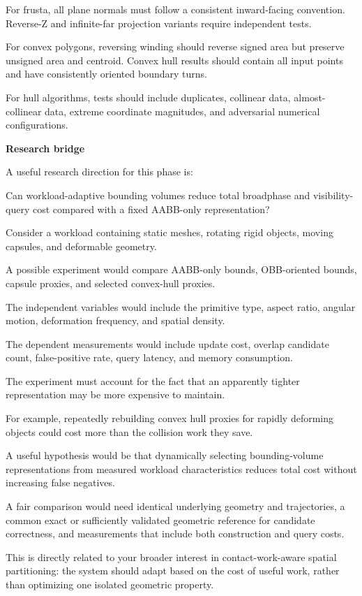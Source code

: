 For frusta, all plane normals must follow a consistent inward-facing convention. Reverse-Z and infinite-far projection variants require independent tests.

For convex polygons, reversing winding should reverse signed area but preserve unsigned area and centroid. Convex hull results should contain all input points and have consistently oriented boundary turns.

For hull algorithms, tests should include duplicates, collinear data, almost-collinear data, extreme coordinate magnitudes, and adversarial numerical configurations.

\textbf{Research bridge}

A useful research direction for this phase is:

Can workload-adaptive bounding volumes reduce total broadphase and visibility-query cost compared with a fixed AABB-only representation?

Consider a workload containing static meshes, rotating rigid objects, moving capsules, and deformable geometry.

A possible experiment would compare AABB-only bounds, OBB-oriented bounds, capsule proxies, and selected convex-hull proxies.

The independent variables would include the primitive type, aspect ratio, angular motion, deformation frequency, and spatial density.

The dependent measurements would include update cost, overlap candidate count, false-positive rate, query latency, and memory consumption.

The experiment must account for the fact that an apparently tighter representation may be more expensive to maintain.

For example, repeatedly rebuilding convex hull proxies for rapidly deforming objects could cost more than the collision work they save.

A useful hypothesis would be that dynamically selecting bounding-volume representations from measured workload characteristics reduces total cost without increasing false negatives.

A fair comparison would need identical underlying geometry and trajectories, a common exact or sufficiently validated geometric reference for candidate correctness, and measurements that include both construction and query costs.

This is directly related to your broader interest in contact-work-aware spatial partitioning: the system should adapt based on the cost of useful work, rather than optimizing one isolated geometric property.

